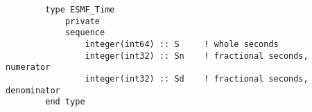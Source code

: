\begin{verbatim}
        type ESMF_Time
            private
            sequence
                integer(int64) :: S     ! whole seconds
                integer(int32) :: Sn    ! fractional seconds, numerator
                integer(int32) :: Sd    ! fractional seconds, denominator
        end type
\end{verbatim}
